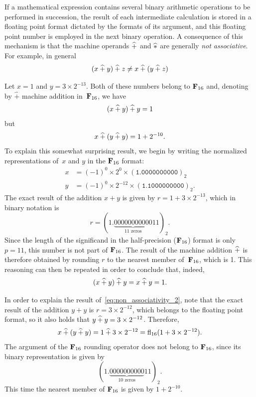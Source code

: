 If a mathematical expression contains several binary arithmetic operations to be performed in succession,
the result of each intermediate calculation is stored in a floating point format dictated by the formats of its argument,
and this floating point number is employed in the next binary operation.
A consequence of this mechanism is that the machine operands $\mathbin{\widehat +}$ and $\mathbin{\widehat *}$ are generally \emph{not associative}.
For example, in general
\[
    (x \mathbin{\widehat +} y) \mathbin{\widehat +}  z \neq x \mathbin{\widehat +} (y \mathbin{\widehat +} z)
\]
\begin{example}
    Let $x = 1$ and $y = 3 \times 2^{-13}$.
    Both of these numbers belong to $\mathbf F_{16}$ and,
    denoting by $\widehat +$ machine addition in~$\mathbf F_{16}$,
    we have
    \begin{equation}
        \label{eq:non_associativity_1}
        (x \mathbin{\widehat +} y) \mathbin{\widehat +} y = 1
    \end{equation}
    but
    \begin{equation}
        \label{eq:non_associativity_2}
        x \mathbin{\widehat +} (y \mathbin{\widehat +} y) = 1 + 2^{-10}.
    \end{equation}
    To explain this somewhat surprising result,
    we begin by writing the normalized representations of~$x$ and $y$ in the $\mathbf F_{16}$ format:
    \begin{align*}
        x &= (-1)^0 \times 2^0 \times (\texttt{1.0000000000})_2 \\
        y &= (-1)^0 \times 2^{-12} \times (\texttt{1.1000000000})_2.
    \end{align*}
    The exact result of the addition $x + y$ is given by $r = 1 + 3 \times 2^{-13}$,
    which in binary notation is
    \[
        r = (1.\underbrace{00000000000}_{\text{11 zeros}}11)_2.
    \]
    Since the length of the significand in the half-precision ($\mathbf F_{16}$) format is only $p = 11$,
    this number is not part of $\mathbf F_{16}$.
    The result of the machine addition $\mathbin{\widehat +}$ is therefore obtained by rounding $r$ to the nearest member of~$\mathbf F_{16}$,
    which is 1.
    This reasoning can then be repeated in order to conclude that, indeed,
    \[
        (x \mathbin{\widehat +} y) \mathbin{\widehat +} y = x \mathbin{\widehat +} y = 1.
    \]

    In order to explain the result of~\eqref{eq:non_associativity_2},
    note that the exact result of the addition $y + y$ is $r = 3 \times 2^{-12}$,
    which belongs to the floating point format,
    so it also holds that $y \mathbin{\widehat +} y = 3 \times 2^{-12}$.
    Therefore,
    \[
        x \mathbin{\widehat +} (y \mathbin{\widehat +} y) = 1 \mathbin{\widehat +} 3 \times 2^{-12} = {\rm fl}_{16} (1 + 3 \times 2^{-12}).
    \]
    The argument of the $\mathbf F_{16}$ rounding operator does not belong to $\mathbf F_{16}$,
    since its binary representation is given by
    \[
        (1.\underbrace{0000000000}_{\text{10 zeros}}11)_2.
    \]
    This time the nearest member of $\mathbf F_{16}$ is given by $1 + 2^{-10}$.
\end{example}

